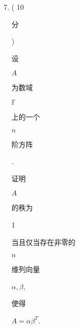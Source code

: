 \documentclass[10pt]{article}
\begin{document}
\begin{enumerate}
  \setcounter{enumi}{6}
  \item ( 10 \begin{CJK}{UTF8}{mj}分\end{CJK}) \begin{CJK}{UTF8}{mj}设\end{CJK} $A$ \begin{CJK}{UTF8}{mj}为数域\end{CJK} $\mathbb{F}$ \begin{CJK}{UTF8}{mj}上的一个\end{CJK} $n$ \begin{CJK}{UTF8}{mj}阶方阵\end{CJK}. \begin{CJK}{UTF8}{mj}证明\end{CJK} $A$ \begin{CJK}{UTF8}{mj}的秩为\end{CJK} 1 \begin{CJK}{UTF8}{mj}当且仅当存在非零的\end{CJK} $n$ \begin{CJK}{UTF8}{mj}维列向量\end{CJK} $\alpha, \beta$, \begin{CJK}{UTF8}{mj}使得\end{CJK} $A=\alpha \beta^{T}$.


\end{enumerate}
\end{document}
